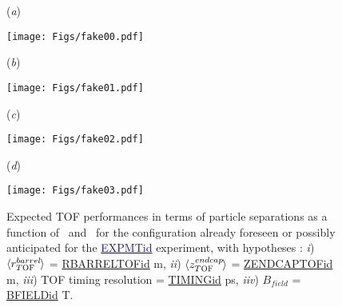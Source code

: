 
   \begin{figure}[!p]
   
        \caption{Expected TOF performances in terms of particle separations as a function of \pT\ and \rap\ for the 
        configuration already foreseen or possibly anticipated for the \underline{\textcolor{MidnightBlue}{EXPMTid}} experiment,
        with hypotheses : \newline
        \emph{i}) $\langle r_{T\textsc{OF}}^{barrel} \kern-0.1em\rangle$ = \underline{RBARRELTOFid} m,
        \emph{ii}) $\langle z_{T\textsc{OF}}^{endcap} \kern-0.1em\rangle$ = \underline{ZENDCAPTOFid} m,
        \emph{iii}) TOF timing resolution = \underline{TIMINGid} ps,
        \emph{iiv}) $B_{field}$ = \underline{BFIELDid} T.}
        \label{Fig:TOFsep-EXPMTid-RbarrelTOF=RBARRELTOFidm-ZendcapTOF=ZENDCAPTOFidm-TimingResol=TIMINGidps-Bfield=BFIELDidT}   
   
        \begin{minipage}[c]{.02\linewidth}  \centering (\emph{a})  \end{minipage} \hfill
        \begin{minipage}[c]{.45\linewidth}
                \texttt{[image: Figs/fake00.pdf]}
        \end{minipage} \hfill
        \begin{minipage}[c]{.02\linewidth}  \centering (\emph{b})  \end{minipage} \hfill
        \begin{minipage}[c]{.45\linewidth}
                \texttt{[image: Figs/fake01.pdf]}
        \end{minipage} \hfill   
        
        
        \vspace*{0.5 cm}
        \begin{minipage}[c]{.02\linewidth}  \centering (\emph{c})  \end{minipage} \hfill
        \begin{minipage}[c]{.45\linewidth}
                \texttt{[image: Figs/fake02.pdf]}
        \end{minipage} \hfill
        \begin{minipage}[c]{.02\linewidth}  \centering (\emph{d})  \end{minipage} \hfill
        \begin{minipage}[c]{.45\linewidth}
                \texttt{[image: Figs/fake03.pdf]}
        \end{minipage} \hfill   


\end{figure}
